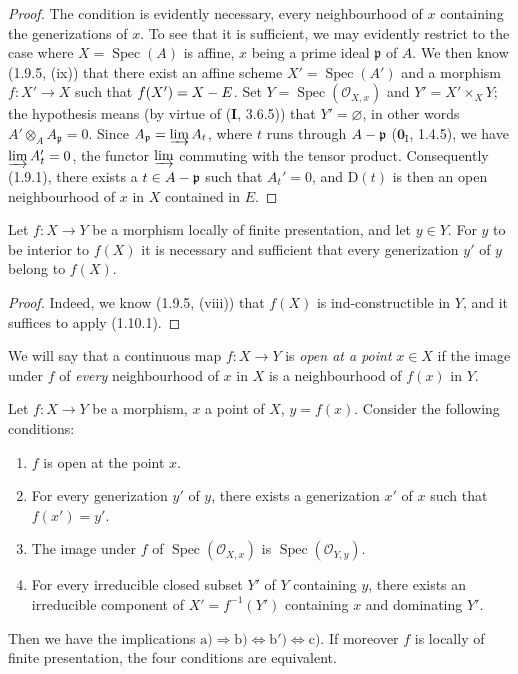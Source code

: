 \begin{proof}
The condition is evidently necessary, every neighbourhood of $x$ containing
the generizations of $x$. To see that it is sufficient, we may evidently
restrict to the case where $X=\operatorname{Spec}(A)$ is affine, $x$ being a prime ideal
$\mathfrak p$ of $A$. We then know (1.9.5, (ix)) that there exist an affine
scheme $X'=\operatorname{Spec}(A')$ and a morphism $f:X'\to X$ such that
$f(X')=X- E$. Set $Y=\operatorname{Spec}(\mathcal O_{X,x})$ and
$Y'=X'\times_XY$; the hypothesis means (by
virtue of (\textbf{I}, 3.6.5)) that $Y'=\varnothing$, in other words
$A'\otimes_AA_{\mathfrak p}=0$. Since
$A_{\mathfrak p}=\varinjlim A_t$, where $t$ runs through $A-\mathfrak p$
($\mathbf{0}_{\mathrm I}$, 1.4.5), we have $\varinjlim A_t'=0$, the functor
$\varinjlim$ commuting with the tensor product. Consequently (1.9.1), there
exists a $t\in A-\mathfrak p$ such that $A_t'=0$, and $\mathrm D(t)$ is then
an open neighbourhood of $x$ in $X$ contained in $E$.
\end{proof}

\begin{corollary}[1.10.2]
\label{IV.1.10.2}
Let $f:X\to Y$ be a morphism locally of finite presentation, and let
$y\in Y$. For $y$ to be interior to $f(X)$ it is necessary and sufficient that
every generization $y'$ of $y$ belong to $f(X)$.
\end{corollary}

\begin{proof}
Indeed, we know (1.9.5, (viii)) that $f(X)$ is ind-constructible in $Y$, and
it suffices to apply (1.10.1).
\end{proof}

We will say that a continuous map $f:X\to Y$ is \emph{open at a
point} $x\in X$ if the image under $f$ of \emph{every} neighbourhood of $x$
in $X$ is a neighbourhood of $f(x)$ in $Y$.

\begin{proposition}[1.10.3]\label{IV.1.10.3}
Let $f:X\to Y$ be a morphism, $x$ a point of $X$, $y=f(x)$. Consider
the following conditions:
\begin{enumerate}
  \item[\textup{a)}] $f$ is open at the point $x$.
  \item[\textup{b)}] For every generization $y'$ of $y$, there exists a generization
  $x'$ of $x$ such that $f(x')=y'$.
  \item[\textup{b')}] The image under $f$ of $\operatorname{Spec}(\mathcal O_{X,x})$ is
  $\operatorname{Spec}(\mathcal O_{Y,y})$.
  \item[\textup{c)}] For every irreducible closed subset $Y'$ of $Y$ containing $y$,
  there exists an irreducible component of $X'=f^{-1}(Y')$ containing $x$ and
  dominating $Y'$.
\end{enumerate}
Then we have the implications
$\mathrm{a)}\Rightarrow\mathrm{b)}\Leftrightarrow\mathrm{b')}
\Leftrightarrow\mathrm{c)}$. If moreover $f$ is locally of finite
presentation, the four conditions are equivalent.
\end{proposition}

